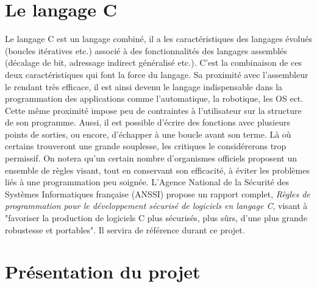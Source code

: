 \documentclass[a4paper]{article}
\begin{document}
\newpage

\section{Le langage C}
Le langage C est un langage combiné, il a les caractéristiques des langages évolués (boucles itératives etc.) associé à des fonctionnalités des langages assemblés (décalage de bit, adressage indirect généralisé etc.). C'est la combinaison de ces deux caractéristiques qui font la force du langage\cite{Monteil2012}. Sa proximité avec l'assembleur le rendant très efficace, il est ainsi devenu le langage indispensable dans la programmation des applications comme l'automatique, la robotique, les OS ect. Cette même proximité impose peu de contraintes à l'utilisateur sur la structure de son programme. Aussi, il est possible d'écrire des fonctions avec plusieurs points de sorties, ou encore, d'échapper à une boucle avant son terme. Là où certains trouveront une grande souplesse, les critiques le considérerons trop permissif. On notera qu'un certain nombre d'organismes officiels proposent un ensemble de règles visant, tout en conservant son efficacité, à éviter les problèmes liés à une programmation peu soignée. L'Agence National de la Sécurité des Systèmes Informatiques française (ANSSI) propose un rapport complet, \textit{Règles de programmation pour le développement sécurisé de logiciels en langage C}\cite{ANSSI2021}, visant à "favoriser la production de logiciels C plus sécurisés, plus sûrs, d’une plus grande robustesse et portables". Il servira de référence durant ce projet.

\newpage
    \section{Présentation du projet}
\end{document}
